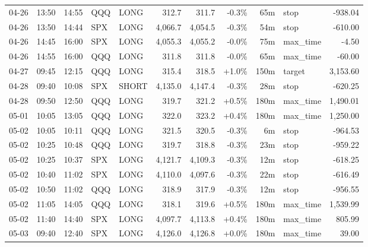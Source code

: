 \documentclass[11pt,a4paper,twoside]{article}
\begin{document}
\begin{center}
\begin{longtable}{>{\color{txtmain}}l l l l l r r r r >{\color{txtmain}}l r}
04-26 & 13:50 & 14:55 & QQQ & LONG & 312.7 & 311.7 & \textcolor{lossred}{-0.3\%} & 65m & stop & \textcolor{lossred}{-938.04} \\
04-26 & 13:50 & 14:44 & SPX & LONG & 4,066.7 & 4,054.5 & \textcolor{lossred}{-0.3\%} & 54m & stop & \textcolor{lossred}{-610.00} \\
04-26 & 14:45 & 16:00 & SPX & LONG & 4,055.3 & 4,055.2 & \textcolor{lossred}{-0.0\%} & 75m & max\_time & \textcolor{lossred}{-4.50} \\
04-26 & 14:55 & 16:00 & QQQ & LONG & 311.8 & 311.8 & \textcolor{lossred}{-0.0\%} & 65m & max\_time & \textcolor{lossred}{-60.00} \\
04-27 & 09:45 & 12:15 & QQQ & LONG & 315.4 & 318.5 & \textcolor{wingreen}{+1.0\%} & 150m & target & \textcolor{wingreen}{3,153.60} \\
04-28 & 09:40 & 10:08 & SPX & SHORT & 4,135.0 & 4,147.4 & \textcolor{lossred}{-0.3\%} & 28m & stop & \textcolor{lossred}{-620.25} \\
04-28 & 09:50 & 12:50 & QQQ & LONG & 319.7 & 321.2 & \textcolor{wingreen}{+0.5\%} & 180m & max\_time & \textcolor{wingreen}{1,490.01} \\
05-01 & 10:05 & 13:05 & QQQ & LONG & 322.0 & 323.2 & \textcolor{wingreen}{+0.4\%} & 180m & max\_time & \textcolor{wingreen}{1,250.00} \\
05-02 & 10:05 & 10:11 & QQQ & LONG & 321.5 & 320.5 & \textcolor{lossred}{-0.3\%} & 6m & stop & \textcolor{lossred}{-964.53} \\
05-02 & 10:25 & 10:48 & QQQ & LONG & 319.7 & 318.8 & \textcolor{lossred}{-0.3\%} & 23m & stop & \textcolor{lossred}{-959.22} \\
05-02 & 10:25 & 10:37 & SPX & LONG & 4,121.7 & 4,109.3 & \textcolor{lossred}{-0.3\%} & 12m & stop & \textcolor{lossred}{-618.25} \\
05-02 & 10:40 & 11:02 & SPX & LONG & 4,110.0 & 4,097.6 & \textcolor{lossred}{-0.3\%} & 22m & stop & \textcolor{lossred}{-616.49} \\
05-02 & 10:50 & 11:02 & QQQ & LONG & 318.9 & 317.9 & \textcolor{lossred}{-0.3\%} & 12m & stop & \textcolor{lossred}{-956.55} \\
05-02 & 11:05 & 14:05 & QQQ & LONG & 318.1 & 319.6 & \textcolor{wingreen}{+0.5\%} & 180m & max\_time & \textcolor{wingreen}{1,539.99} \\
05-02 & 11:40 & 14:40 & SPX & LONG & 4,097.7 & 4,113.8 & \textcolor{wingreen}{+0.4\%} & 180m & max\_time & \textcolor{wingreen}{805.99} \\
05-03 & 09:40 & 12:40 & SPX & LONG & 4,126.0 & 4,126.8 & \textcolor{wingreen}{+0.0\%} & 180m & max\_time & \textcolor{wingreen}{39.00} \\

\end{longtable}
\end{center}
\end{document}

